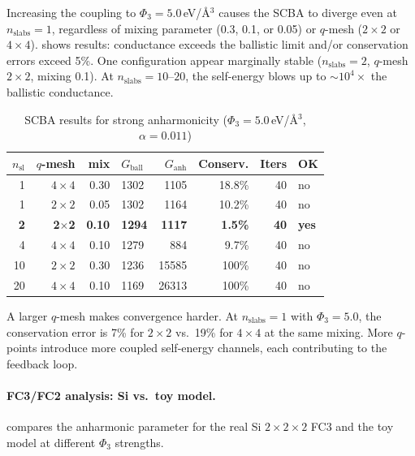 Increasing the coupling to $\Phi_3 = 5.0$\,eV/\AA$^3$ causes the
SCBA to diverge even at $n_\mathrm{slabs} = 1$, regardless of mixing
parameter (0.3, 0.1, or 0.05) or $q$-mesh ($2\times 2$ or
$4\times 4$).   shows results:
conductance exceeds the ballistic limit and/or conservation errors
exceed 5\%. One configuration appear marginally stable
($n_\mathrm{slabs} = 2$, $q$-mesh $2\times 2$, mixing 0.1).  At $n_\mathrm{slabs} = 10$--$20$, the
self-energy blows up to $\sim$$10^4\times$ the ballistic conductance.

\begin{table}[h]
  \centering
  \caption{SCBA results for strong anharmonicity
    ($\Phi_3 = 5.0$\,eV/\AA$^3$, $\alpha = 0.011$)}
  \label{tab:toy_strong}
  \begin{tabular}{rrrlrrrl}
    \toprule
    $n_\mathrm{sl}$ & $q$-mesh & mix & $G_\mathrm{ball}$
      & $G_\mathrm{anh}$ & Conserv. & Iters & OK \\
    \midrule
    1 & $4\times 4$ & 0.30 & 1302 & 1105 & 18.8\% & 40 & no \\
    1 & $2\times 2$ & 0.05 & 1302 & 1164 & 10.2\% & 40 & no \\
    \textbf{2} & \textbf{2$\times$2} & \textbf{0.10}
      & \textbf{1294} & \textbf{1117} & \textbf{1.5\%}
      & \textbf{40} & \textbf{yes} \\
    4 & $4\times 4$ & 0.10 & 1279 &  884 & 9.7\%  & 40 & no \\
    10 & $2\times 2$ & 0.30 & 1236 & 15585 & 100\% & 40 & no \\
    20 & $4\times 4$ & 0.10 & 1169 & 26313 & 100\% & 40 & no \\
    \bottomrule
  \end{tabular}
\end{table}

A larger $q$-mesh makes convergence harder.  At $n_\mathrm{slabs} = 1$ with $\Phi_3 = 5.0$, the
conservation error is 7\% for $2\times 2$ vs.\ 19\% for
$4\times 4$ at the same mixing.  More $q$-points introduce more
coupled self-energy channels, each contributing to the feedback loop.

\paragraph{FC3/FC2 analysis: Si vs.\ toy model.}
 compares the anharmonic parameter for the real Si
$2\times 2\times 2$ FC3 and the toy model at different $\Phi_3$
strengths.

